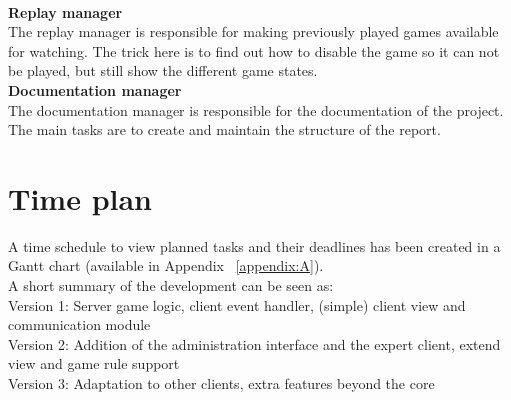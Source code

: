 \\\newline
\textbf{Replay manager}\\
The replay manager is responsible for making previously played games available for watching. The trick here is to find out how to disable the game so it can not be played, but still show the different game states. 
\\\newline
\textbf{Documentation manager}\\
The documentation manager is responsible for the documentation of the project. The main tasks are to create and maintain the structure of the report.




\section{Time plan}
A time schedule to view planned tasks and their deadlines has been created in a 
Gantt chart (available in Appendix ~\ref{appendix:A}). 
\\\newline
A short summary of the development can be seen as:\\
Version 1: Server game logic, client event handler, (simple) client view and 
communication module \\
Version 2: Addition of the administration interface and the expert client, 
extend view and game rule support\\
Version 3: Adaptation to other clients, extra features beyond the core \\

